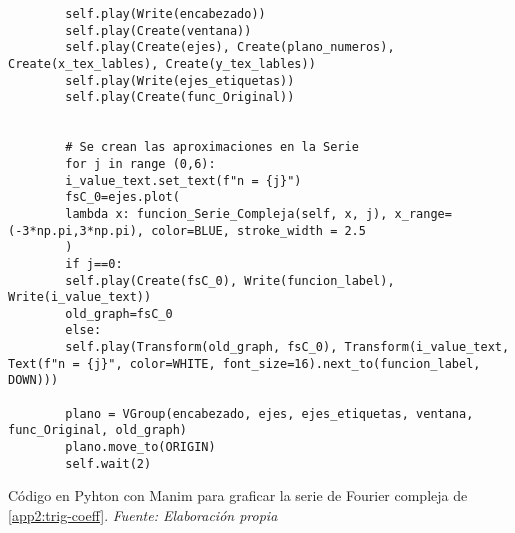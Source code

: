 \begin{longlisting}
\begin{verbatim}
		self.play(Write(encabezado))
		self.play(Create(ventana))
		self.play(Create(ejes), Create(plano_numeros), Create(x_tex_lables), Create(y_tex_lables))
		self.play(Write(ejes_etiquetas))
		self.play(Create(func_Original))
		
		
		# Se crean las aproximaciones en la Serie
		for j in range (0,6):
		i_value_text.set_text(f"n = {j}")
		fsC_0=ejes.plot(
		lambda x: funcion_Serie_Compleja(self, x, j), x_range=(-3*np.pi,3*np.pi), color=BLUE, stroke_width = 2.5
		)
		if j==0:
		self.play(Create(fsC_0), Write(funcion_label), Write(i_value_text))
		old_graph=fsC_0
		else:
		self.play(Transform(old_graph, fsC_0), Transform(i_value_text, Text(f"n = {j}", color=WHITE, font_size=16).next_to(funcion_label, DOWN)))
		
		plano = VGroup(encabezado, ejes, ejes_etiquetas, ventana, func_Original, old_graph)
		plano.move_to(ORIGIN)
		self.wait(2)
	\end{verbatim}
	\caption[Código en Pyhton con Manim para graficar la serie de Fourier compleja de \ref{app2:trig-coeff}.] {Código en Pyhton con Manim para graficar la serie de Fourier compleja de \ref{app2:trig-coeff}. \textit{Fuente: Elaboración propia}} 
\end{longlisting}

